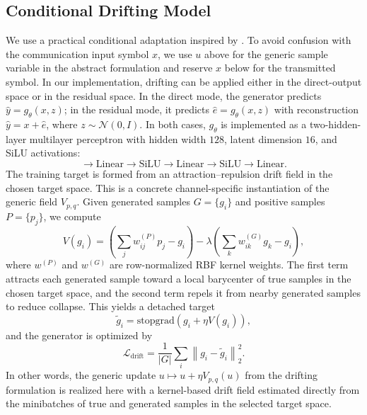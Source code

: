 \documentclass[conference]{IEEEtran}
\begin{document}
\subsection{Conditional Drifting Model}
  We use a practical conditional adaptation inspired by \cite{drifting}.
  To avoid confusion with the communication input symbol \(x\), we use \(u\) above for the generic
  sample variable in the abstract formulation and reserve \(x\) below for the transmitted symbol.
  In our implementation, drifting can be applied either in the direct-output space or in the residual space.
  In the direct mode, the generator predicts \(\hat y = g_\theta(x,z)\); in the residual mode, it predicts
  \(\hat e = g_\theta(x,z)\) with reconstruction \(\hat y = x + \hat e\), where \(z \sim \mathcal{N}(0, I).\)
  In both cases, \(g_\theta\) is implemented as a two-hidden-layer multilayer perceptron with hidden
  width \(128\), latent dimension \(16\), and SiLU activations:
\begin{equation}
[x, z]
\rightarrow
\mathrm{Linear}
\rightarrow
\mathrm{SiLU}
\rightarrow
\mathrm{Linear}
\rightarrow
\mathrm{SiLU}
\rightarrow
\mathrm{Linear}.
\end{equation}
The training target is formed from an attraction--repulsion drift field in the chosen target space. This is a concrete channel-specific instantiation of the generic field \(V_{p,q}\).
Given generated samples \(G = \{g_i\}\) and positive samples \(P = \{p_j\}\), we compute
\begin{equation}
V(g_i)
=
\left(
\sum_j w^{(P)}_{ij} p_j - g_i
\right)
-
\lambda
\left(
\sum_k w^{(G)}_{ik} g_k - g_i
\right),
\end{equation}
where \(w^{(P)}\) and \(w^{(G)}\) are row-normalized RBF kernel weights.
The first term attracts each generated sample toward a local barycenter of true samples in the chosen target space, and the second term repels it from nearby generated samples to reduce collapse.
This yields a detached target
\begin{equation}
\tilde{g}_i
=
\mathrm{stopgrad}\!\left(g_i + \eta V(g_i)\right),
\end{equation}
and the generator is optimized by
\begin{equation}
\mathcal{L}_{\text{drift}}
=
\frac{1}{|G|}
\sum_i
\left\|
g_i - \tilde{g}_i
\right\|_2^2.
\end{equation}
In other words, the generic update \(u \mapsto u + \eta V_{p,q}(u)\) from the drifting formulation is realized here with a kernel-based drift field estimated directly from the minibatches of true and generated samples in the selected target space.
\end{document}
